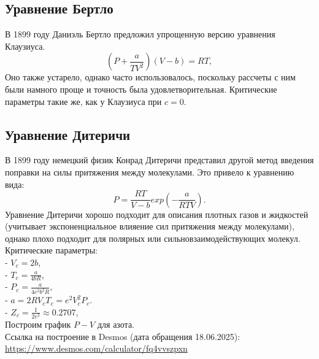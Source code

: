 \documentclass[a4paper]{article}
\numberwithin{equation}{subsection} %
\begin{document}
\subsection{Уравнение Бертло}
В 1899 году Даниэль Бертло предложил упрощенную версию уравнения Клаузиуса.
\begin{equation}
      (P + \frac{a}{TV^2})(V - b) = RT,
\tag{\thesubsection}
\end{equation}
Оно также устарело, однако часто использовалось, поскольку рассчеты с ним были намного проще и точность была удовлетворительная. Критические параметры такие же, как у Клаузиуса при $c = 0$.

\subsection{Уравнение Дитеричи}
В 1899 году немецкий физик Конрад Дитеричи представил другой метод введения поправки на силы притяжения между молекулами. Это привело к уравнению вида:
\begin{equation}
      P = \frac{RT}{V-b}exp\left( -\frac{a}{RTV}\right).
\tag{\thesubsection}
\end{equation}
Уравнение Дитеричи хорошо подходит для описания плотных газов и жидкостей (учитывает экспоненциальное влияение сил притяжения между молекулами), однако плохо подходит для полярных или сильновзаимодействующих молекул.
Критические параметры:\\
- $V_c = 2b$,\\
- $T_c = \frac{a}{4bR}$,\\
- $P_c = \frac{a}{4e^2b^2R}$,\\
- $a = 2RV_cT_c = e^2V_c^2P_c$.\\
- $Z_c = \frac{1}{2e^2} \approx 0.2707$,\\
Построим график $P-V$ для азота.\\
Ссылка на построение в Desmos (дата обращения 18.06.2025): \href{https://www.desmos.com/calculator/fq4vvszpxn}{https://www.desmos.com/calculator/fq4vvszpxn}
\clearpage
\end{document}
